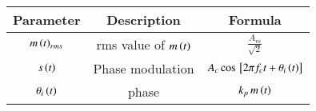 \setlength{\arrayrulewidth}{0.3mm}
\setlength{\tabcolsep}{20pt}
\renewcommand{\arraystretch}{1.6}


\begin{tabular}{|c|c|c|}
\hline
Parameter & Description & Formula\\
\hline
$m\left(t\right)_{rms}$ & rms value of $m\left(t\right)$ & $\frac{A_m}{\sqrt{2}}$\\
\hline
$s\left(t\right)$ & Phase modulation & $A_c\cos {}\left[2\pi f_c t + \theta _i\left(t\right)\right]$\\
\hline
$\theta _i\left(t\right)$ & phase & $k_p\, m\left(t\right)$\\
\hline
\end{tabular}